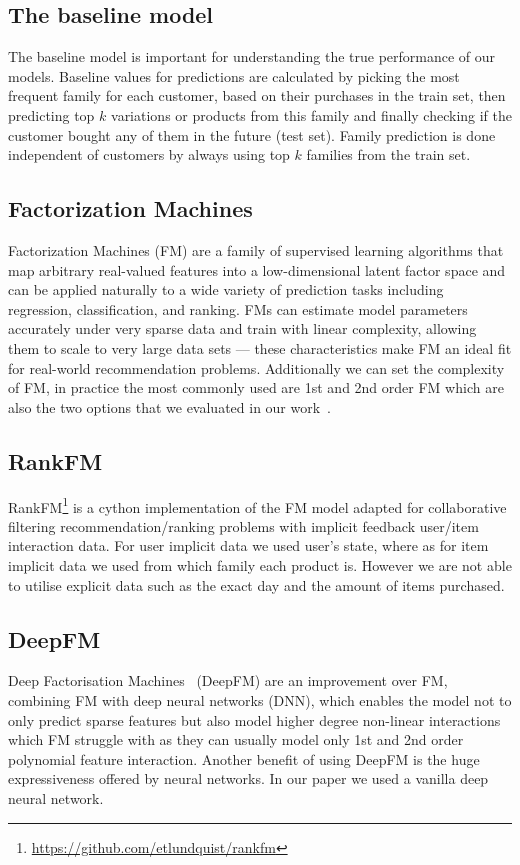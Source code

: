 \documentclass[fleqn,moreauthors,10pt]{ds_report}
\begin{document}
\subsection*{The baseline model}
The baseline model is important for understanding the true performance of our models. Baseline values for predictions are calculated by picking the most frequent family for each customer, based on their purchases in the train set, then predicting top $k$ variations or products from this family and finally checking if the customer bought any of them in the future (test set). Family prediction is done independent of customers by always using top $k$ families from the train set.

\subsection*{Factorization Machines}
Factorization Machines (FM) are a family of supervised learning algorithms that map arbitrary real-valued features into a low-dimensional latent factor space and can be applied naturally to a wide variety of prediction tasks including regression, classification, and ranking. FMs can estimate model parameters accurately under very sparse data and train with linear complexity, allowing them to scale to very large data sets — these characteristics make FM an ideal fit for real-world recommendation problems. Additionally we can set the complexity of FM, in practice the most commonly used are 1st and 2nd order FM which are also the two options that we evaluated in our work~\cite{fm}.

\subsection*{RankFM}
RankFM\footnote{\url{https://github.com/etlundquist/rankfm}} is a cython implementation of the FM model adapted for collaborative filtering recommendation/ranking problems with implicit feedback user/item interaction data. For user implicit data we used user's state, where as for item implicit data we used from which family each product is. However we are not able to utilise explicit data such as the exact day and the amount of items purchased.

\subsection*{DeepFM}
Deep Factorisation Machines~\cite{DeepFM} (DeepFM) are an improvement over FM, combining FM with deep neural networks (DNN), which enables the model not to only predict sparse features but also model higher degree non-linear interactions which FM struggle with as they can usually model only 1st and 2nd order polynomial feature interaction.
Another benefit of using DeepFM is the huge expressiveness offered by neural networks.
In our paper we used a vanilla deep neural network.
\end{document}
